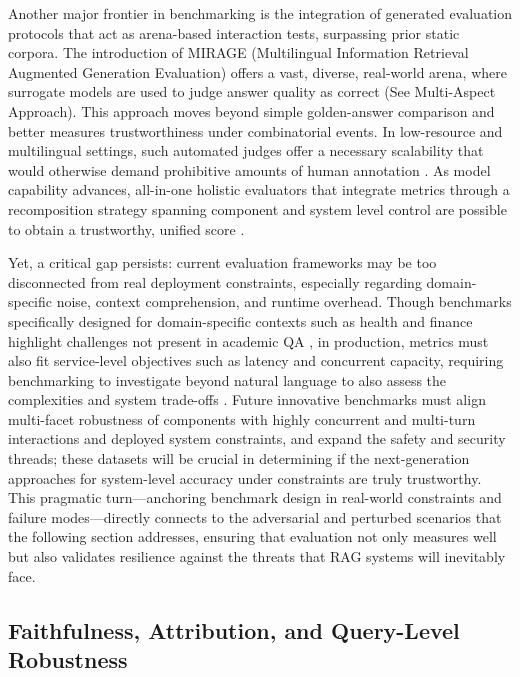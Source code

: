 \documentclass[11pt,a4paper]{article}
\begin{document}
Another major frontier in benchmarking is the integration of generated evaluation protocols that act as arena-based interaction tests, surpassing prior static corpora. The introduction of MIRAGE (Multilingual Information Retrieval Augmented Generation Evaluation) offers a vast, diverse, real-world arena, where surrogate models are used to judge answer quality as correct (See Multi-Aspect Approach). This approach moves beyond simple golden-answer comparison and better measures trustworthiness under combinatorial events. In low-resource and multilingual settings, such automated judges offer a necessary scalability that would otherwise demand prohibitive amounts of human annotation \cite{arxiv:2405.06211v3}. As model capability advances, all-in-one holistic evaluators that integrate metrics through a recomposition strategy spanning component and system level control are possible to obtain a trustworthy, unified score \cite{arxiv:2506.00054v1}.

Yet, a critical gap persists: current evaluation frameworks may be too disconnected from real deployment constraints, especially regarding domain-specific noise, context comprehension, and runtime overhead. Though benchmarks specifically designed for domain-specific contexts such as health and finance highlight challenges not present in academic QA \cite{arxiv:2411.11895v1}, in production, metrics must also fit service-level objectives such as latency and concurrent capacity, requiring benchmarking to investigate beyond natural language to also assess the complexities and system trade-offs \cite{arxiv:2412.11854v1}. Future innovative benchmarks must align multi-facet robustness of components with highly concurrent and multi-turn interactions and deployed system constraints, and expand the safety and security threads; these datasets will be crucial in determining if the next-generation approaches for system-level accuracy under constraints are truly trustworthy. This pragmatic turn---anchoring benchmark design in real-world constraints and failure modes---directly connects to the adversarial and perturbed scenarios that the following section addresses, ensuring that evaluation not only measures well but also validates resilience against the threats that RAG systems will inevitably face.


\subsection{Faithfulness, Attribution, and Query-Level Robustness}
\end{document}
